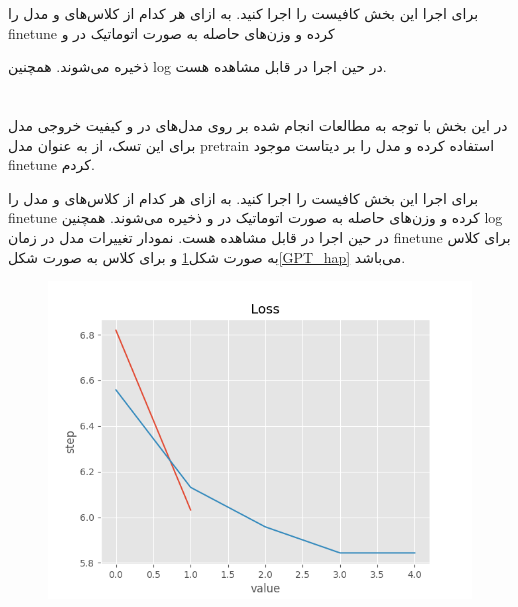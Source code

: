 \documentclass[10pt]{article}
\begin{document}
برای اجرا این بخش کافیست
را اجرا کنید.
به ازای هر کدام از کلاس‌های 
و
مدل را finetune کرده و وزن‌های حاصله به صورت اتوماتیک در
و

ذخیره می‌شوند. همچنین log در حین اجرا در 
قابل مشاهده هست.

\newpage
\section{
}

\subsection{}
در این بخش با توجه به مطالعات انجام شده بر روی مدل‌های
 در 
و کیفیت خروجی مدل برای این تسک، از
به عنوان مدل pretrain استفاده کرده و مدل را بر دیتاست موجود finetune کردم.

برای اجرا این بخش کافیست
را اجرا کنید.
به ازای هر کدام از کلاس‌های 
و
مدل را finetune کرده و وزن‌های حاصله به صورت اتوماتیک در
و
ذخیره می‌شوند. همچنین log در حین اجرا در 
قابل مشاهده هست. نمودار تغییرات  
مدل در زمان finetune برای کلاس
 به صورت شکل\ref{GPT_dep}
 و برای کلاس
به صورت شکل\ref{GPT_hap}
می‌باشد.
	\begin{figure}[H]
		\centering\includegraphics[width=\linewidth]{../reports/loss_history_GPT2_depression.png}
		\caption{ 
			}
		\label{GPT_dep}
	\end{figure}
	
\end{document}
